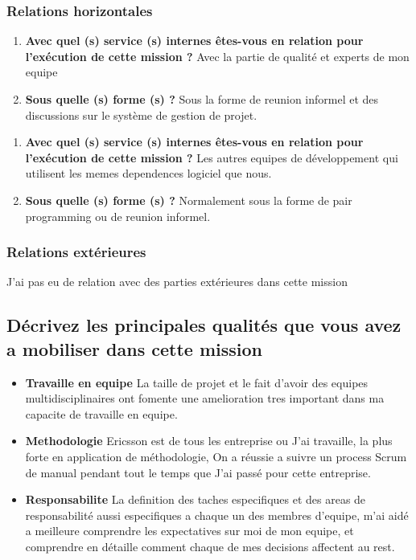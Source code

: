 \documentclass{resume} %
\begin{document}
	\subsubsection {Relations horizontales}
	\begin{enumerate}
		\item \textbf{ Avec quel (s) service (s) internes êtes-vous en relation pour l'exécution de cette mission ?}
			Avec la partie de qualité et experts de mon equipe
		\item \textbf{Sous quelle (s) forme (s) ?}
			Sous la forme de reunion informel et des discussions sur le système de gestion de projet. 
	\end {enumerate}	
	\begin{enumerate}
		\item \textbf{ Avec quel (s) service (s) internes êtes-vous en relation pour l'exécution de cette mission ?}
			Les autres equipes de développement qui utilisent les memes dependences logiciel que nous. 
		\item \textbf{Sous quelle (s) forme (s) ?}
			Normalement sous la forme de pair programming ou de reunion informel.
	\end {enumerate}	

	\subsubsection {Relations extérieures}
		J'ai pas eu de relation avec des parties extérieures dans cette mission 
		
			
\subsection{Décrivez les principales qualités que vous avez a mobiliser dans cette mission}
	
		\begin{itemize} 				
			\item \textbf{Travaille en equipe} \newline
				La taille de projet et le fait d'avoir des equipes multidisciplinaires ont fomente une amelioration tres important dans ma capacite de travaille en equipe. 
			\item \textbf{Methodologie} \newline
				Ericsson est de tous les entreprise ou J'ai travaille, la plus forte en application de méthodologie, On a réussie a suivre un process Scrum de manual pendant tout le temps que J'ai passé pour cette entreprise.  
			\item \textbf{Responsabilite  } \newline
				La definition des taches especifiques et des areas de responsabilité aussi especifiques a chaque un des membres  d'equipe, m'ai aidé a meilleure comprendre les expectatives sur moi de mon equipe, et comprendre en détaille comment chaque de mes decisions affectent au rest.  
		\end{itemize}
		
\end{document}
